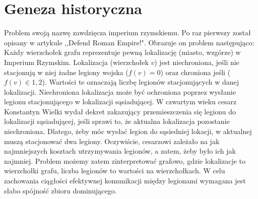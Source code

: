 \section{Geneza historyczna}
Problem swoją nazwę zawdzięcza imperium rzymskiemu. Po raz pierwszy został opisany w artykule ,,Defend Roman Empire!".\cite{defendRomanEmpire}
Obrazuje on problem następująco: Każdy wierzchołek grafu reprezentuje pewną lokalizację (miasto, wzgórze) w Imperium Rzymskim. Lokalizacja (wierzchołek $v$) jest niechroniona, jeśli nie stacjonują w niej żadne legiony wojska ($f(v) = 0$) oraz chroniona jeśli ($f(v) \in {1,2} $). Wartości te oznaczają liczbę legionów stacjonujących w danej lokalizacji. Niechroniona lokalizacja może być ochroniona poprzez wysłanie legionu stacjonującego w lokalizacji sąsiadującej. W czwartym wieku cesarz Konstantyn Wielki wydał dekret zakazujący przemieszczenia się legionu do lokalizacji sąsiadującej, jeśli sprawi to, że aktualna lokalizacja pozostanie niechroniona. Dlatego, żeby móc wysłać legion do sąsiedniej lokacji, w aktualnej muszą stacjonować dwa legiony. Oczywiście, cesarzowi zależało na jak najmniejszych kosztach utrzymywania legionów, a zatem, żeby było ich jak najmniej. \cite{theoryWCRDF} Problem możemy zatem zinterpretować grafowo, gdzie lokalizacje to wierzchołki grafu, liczba legionów to wartości na wierzchołkach. W celu zachowania ciągłości efektywnej komunikacji między legionami wymagana jest słabo spójność zbioru dominującego.

